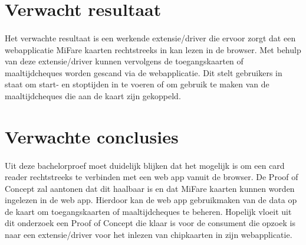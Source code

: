 \section{Verwacht resultaat}%
\label{sec:verwachte_resultaten}
\paragraph{}
Het verwachte resultaat is een werkende extensie/driver die ervoor zorgt dat een webapplicatie MiFare kaarten rechtstreeks in kan lezen in de browser. Met behulp van deze extensie/driver kunnen vervolgens de toegangskaarten of maaltijdcheques worden gescand via de webapplicatie. Dit stelt gebruikers in staat om start- en stoptijden in te voeren of om gebruik te maken van de maaltijdcheques die aan de kaart zijn gekoppeld.

\bigskip
\section{Verwachte conclusies}%
\label{sec:Verwachte_conclusies}
\paragraph{}
Uit deze bachelorproef moet duidelijk blijken dat het mogelijk is om een card reader rechtstreeks te verbinden met een web app vanuit de browser. De Proof of Concept zal aantonen dat dit haalbaar is en dat MiFare kaarten kunnen worden ingelezen in de web app. Hierdoor kan de web app gebruikmaken van de data op de kaart om toegangskaarten of maaltijdcheques te beheren. Hopelijk vloeit uit dit onderzoek een Proof of Concept die klaar is voor de consument die opzoek is naar een extensie/driver voor het inlezen van chipkaarten in zijn webapplicatie.